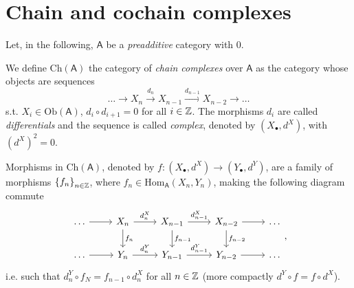 \section{Chain and cochain complexes}
Let, in the following, $\mathsf{A}$ be a {\em preadditive} category with $0$.

\begin{defn}
	We define $\mathrm{Ch}(\mathsf{A})$ the category of {\em chain complexes} over $\mathsf{A}$
	as the category whose objects are sequences
	\begin{equation}
	\ldots \to X_n \xrightarrow{d_n} X_{n-1}
	\xrightarrow{d_{n-1}} X_{n-2} \to \ldots
	\end{equation} 
	s.t. $X_i \in \mathrm{Ob} \left(\mathsf{A}\right)$, $d_i \circ d_{i+1} = 0$ for all $i \in \mathbb{Z}$.
	The morphisms $d_i$ are called {\em differentials} and the sequence is called {\em complex},
	denoted by $\left( X_{\bullet}, d^X \right)$, with $\left( d^X \right)^2 = 0$.

	Morphisms in $\mathrm{Ch}(\mathsf{A})$, denoted by
	$f\colon\left(X_{\bullet}, d^X\right) \to \left(Y_{\bullet}, d^Y\right)$,
	are a family of morphisms $\left\{ f_n \right\}_{n \in \mathbb{Z}}$, where
	$f_n \in \mathrm{Hom}_{\mathsf{A}} \left( X_n, Y_n \right)$,
	making the following diagram commute
	\begin{equation}
	\begin{tikzcd}
		\ldots \arrow[r, "", rightarrow] &
		X_n \arrow[r, "d^X_n", rightarrow] \arrow[d, "f_n", rightarrow] &
		X_{n-1} \arrow[r, "d^X_{n-1}", rightarrow] \arrow[d, "f_{n-1}", rightarrow] &
		X_{n-2} \arrow[r, "", rightarrow] \arrow[d, "f_{n-2}", rightarrow] &
		\ldots \\
		\ldots \arrow[r, "", rightarrow] &
		Y_n \arrow[r, "d^Y_n", rightarrow]&
		Y_{n-1} \arrow[r, "d^Y_{n-1}", rightarrow] &
		Y_{n-2} \arrow[r, "", rightarrow] &
		\ldots
	\end{tikzcd}
	,\end{equation} 
	i.e. such that $d^Y_n \circ f_N = f_{n-1} \circ d^X_n$ for all $n \in \mathbb{Z}$
	(more compactly $d^Y \circ f = f \circ d^X$).
\end{defn}

